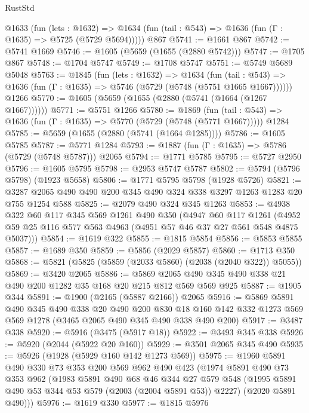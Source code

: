 \begin{lexlean}{RustStd}
\begin{coremodule}
{\begin{coremodule}
{{{{{{{{{{{{{{    @1633
      (fun (lets : @1632) =>
      @1634 (fun (tail : @543) => @1636 (fun (Γ : @1635) => @5725 (@5729 @5694)))))
    @867
@5741 := @1661 @867
@5742 := @5741 @1669
@5746 := @1605 (@5659 (@1655 (@2880 @5742)))
@5747 := @1705 @867
@5748 := @1704 @5747
@5749 := @1708 @5747
@5751 := @5749 @5689 @5048
@5763 := @1845
    (fun (lets : @1632) =>
    @1634
      (fun (tail : @543) => @1636 (fun (Γ : @1635) => @5746 (@5729 (@5748 (@5751 @1665 @1667))))))
    @1266
@5770 := @1605 (@5659 (@1655 (@2880 (@5741 (@1664 (@1267 @1667))))))
@5771 := @5751 @1266
@5780 := @1869
    (fun (tail : @543) => @1636 (fun (Γ : @1635) => @5770 (@5729 (@5748 (@5771 @1667)))))
    @1284
@5785 := @5659 (@1655 (@2880 (@5741 (@1664 @1285))))
@5786 := @1605 @5785
@5787 := @5771 @1284
@5793 := @1887 (fun (Γ : @1635) => @5786 (@5729 (@5748 @5787))) @2065
@5794 := @1771 @5785
@5795 := @5727 @2950
@5796 := @1605 @5795
@5798 := @2953 @5747 @5787
@5802 := @5794 (@5796 @5798) (@1923 @5658)
@5806 := @1771 @5795 @5798 (@1928 @5726)
@5821 := @3287 @2065 @490 @490 @200 @345 @490 @324 @338 @3297 @1263 @1283 @20 @755 @1254 @588
@5825 := @2079 @490 @324 @345 @1263
@5853 := @4938
    @322
    @60
    @117
    @345
    @569
    @1261
    @490
    @350
    (@4947
      @60
      @117
      @1261
      (@4952 @59 @25 @116 @577 @563 @4963 (@4951 @57 @46 @37 @27 @561 @548 @4875 @5037)))
@5854 := @1619 @322
@5855 := @1815 @5854
@5856 := @5853 @5855
@5857 := @1689 @350
@5859 := @5856 (@2029 @5857)
@5860 := @1713 @350
@5868 := @5821 (@5825 (@5859 (@2033 @5860) (@2038 (@2040 @322)) @5055))
@5869 := @3420 @2065
@5886 := @5869 @2065 @490 @345 @490 @338 @21 @490 @200 @1282 @35 @168 @20 @215 @812 @569 @569 @925
@5887 := @1905 @344
@5891 := @1900 (@2165 (@5887 @2166)) @2065
@5916 := @5869
    @5891
    @490
    @345
    @490
    @338
    @20
    @490
    @200
    @830
    @18
    @160
    @142
    @332
    @1273
    @569
    @569
    @1278
    (@3465 @2065 @490 @345 @490 @338 @490 @200)
@5917 := @3487 @338
@5920 := @5916 (@3475 (@5917 @18))
@5922 := @3493 @345 @338
@5926 := @5920 (@2044 (@5922 @20 @160))
@5929 := @3501 @2065 @345 @490
@5935 := @5926 (@1928 (@5929 @160 @142 @1273 @569))
@5975 := @1960
    @5891
    @490
    @330
    @73
    @353
    @200
    @569
    @962
    @490
    @423
    (@1974
      @5891
      @490
      @73
      @353
      @962
      (@1983
        @5891
        @490
        @68
        @46
        @344
        @27
        @579
        @548
        (@1995 @5891 @490 @53 @344 @53 @579 (@2003 (@2004 @5891 @53)) @2227)
        (@2020 @5891 @490)))
@5976 := @1619 @330
@5977 := @1815 @5976
}}}}}}}}}}}}}}
\end{coremodule}}
\end{coremodule}
\end{lexlean}
